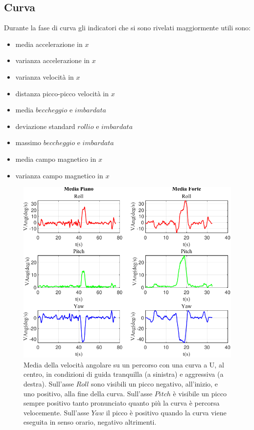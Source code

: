 \documentclass[class=article]{standalone}
\begin{document}
	\newpage
	\subsection{Curva}
	Durante la fase di curva gli indicatori che si sono rivelati maggiormente utili sono:
	\begin{itemize}
		\item media accelerazione in \(x\)
		\item varianza accelerazione in \(x\)
		\item varianza velocità in \(x\)
		\item distanza picco-picco velocità in \(x\)
		\item media \(beccheggio\) e \(imbardata\)
		\item deviazione standard \(rollio\) e \(imbardata\)
		\item massimo \(beccheggio\) e \(imbardata\)
		\item media campo magnetico in \(x\)
		\item varianza campo magnetico in \(x\)

	\end{itemize}
	
	\begin{center}
		\begin{figure}[h!]
			\centering\includegraphics[width=.7\textwidth]{img/CurvaUFP/VAng/Media}
			\caption[]{Media della velocità angolare su un percorso con una curva a U, al centro, in condizioni di guida tranquilla (a sinistra) e aggressiva (a destra). Sull'asse \(Roll\) sono visibili un picco negativo, all'inizio, e uno positivo, alla fine della curva. Sull'asse \(Pitch\) è visibile un picco sempre positivo tanto pronunciato quanto più la curva è percorsa velocemente. Sull'asse \(Yaw\) il picco è positivo quando la curva viene eseguita in senso orario, negativo altrimenti.}
			\label{fig:VAngMedia_CurvaUFP}
		\end{figure}
	\end{center}
	
\end{document}
